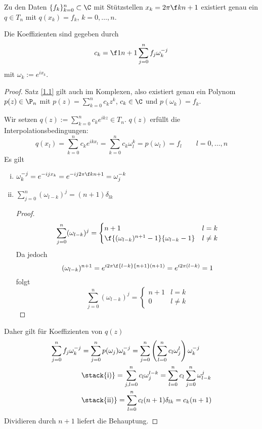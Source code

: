 \documentclass[11pt]{scrbook}
\begin{document}
\begin{st}
	\label{1.24}
	Zu den Daten $\{f_k\}_{k=0}^n \subset \C$ mit Stützstellen $x_k = 2\pi \f k{n+1}$ existiert genau ein $q\in T_n$ mit $q(x_k) = f_k$, $k=0,\dotsc, n$.

	Die Koeffizienten sind gegeben durch
	\[
		c_k = \f 1{n+1}\sum_{j=0}^n f_j \omega_k^{-j}
	\]
	mit $\omega_k := e^{ix_k}$.
	\begin{proof}
		Satz \ref{1.1} gilt auch im Komplexen, also existiert genau ein Polynom $p(z)\in \P_n$ mit $p(z)=\sum_{k=0}^n c_kz^k$, $c_k\in \C$ und $p(\omega_k)=f_k$.

		Wir setzen $q(z) := \sum_{k=0}^n c_ke^{ikz} \in T_n$.
		$q(z)$ erfüllt die Interpolationsbedingungen:
		\[
			q(x_l) = \sum_{k=0}^n c_k e^{ikx_l} = \sum_{k=0}^n c_k \omega_l^k = p(\omega_l) = f_l \qquad l=0,\dotsc,n
		\]
		Es gilt
		\begin{enumerate}[i)]
			\item
				$\displaystyle \omega_k^{-j} = e^{-ij x_k} = e^{-ij 2\pi \f k{n+1}} = \omega_j^{-k}$
			\item
				$\displaystyle \sum_{j=0}^n (\omega_{l-k})^j = (n+1)\delta_{lk}$
				\begin{proof}
					\[
						\sum_{j=0}^n (\omega_{l-k})^j = \begin{cases}
							n+1 & l=k\\
							\f{(\omega_{l-k})^{n+1}-1}{\omega_{l-k}-1} & l\neq k
						\end{cases}
					\]
					Da jedoch 
					\[
						(\omega_{l-k})^{n+1} = e^{i 2\pi\f {l-k}{n+1}(n+1)} = e^{i2\pi(l-k)} = 1
					\]
					folgt
					\[
						\sum_{j=0}^n (\omega_{l-k})^j = \begin{cases}
							n+1 & l=k\\
							0 & l\neq k
						\end{cases}
					\]
				\end{proof}
		\end{enumerate}
		Daher gilt für Koeffizienten von $q(z)$
		\begin{align*}
			\sum_{j=0}^n f_j \omega_k^{-j} &= \sum_{j=0}^n p(\omega_j) \omega_k^{-j}
			= \sum_{j=0}^n\left( \sum_{l=0}^n c_l \omega_j^l\right) \omega_k^{-j}\\
			&\stack{\text{i)}} = \sum_{j,l=0}^n c_l \omega_j^{l-k} 
			= \sum_{l=0}^n c_l \sum_{j=0}^n \omega_{l-k}^j\\
			&\stack{\text{ii)}} = \sum_{l=0}^n c_l (n+1) \delta_{lk} = c_k (n+1)
		\end{align*}
		Dividieren durch $n+1$ liefert die Behauptung.
	\end{proof}
\end{st}
\end{document}
